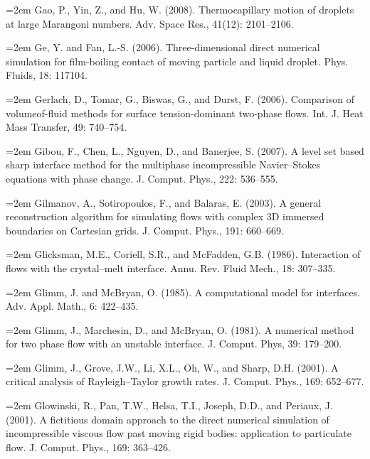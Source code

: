 \documentclass[11pt,a4paper,openany,fontset=none]{ctexbook}
\begin{document}
\par\hangindent=2em Gao, P., Yin, Z., and Hu, W. (2008). Thermocapillary motion of droplets at large Marangoni numbers. Adv. Space Res., 41(12): 2101--2106.

\par\hangindent=2em Ge, Y. and Fan, L.-S. (2006). Three-dimensional direct numerical simulation for film-boiling contact of moving particle and liquid droplet. Phys. Fluids, 18: 117104.

\par\hangindent=2em Gerlach, D., Tomar, G., Biswas, G., and Durst, F. (2006). Comparison of volumeof-fluid methods for surface tension-dominant two-phase flows. Int. J. Heat Mass Transfer, 49: 740--754.

\par\hangindent=2em Gibou, F., Chen, L., Nguyen, D., and Banerjee, S. (2007). A level set based sharp interface method for the multiphase incompressible Navier--Stokes equations with phase change. J. Comput. Phys., 222: 536--555.

\par\hangindent=2em Gilmanov, A., Sotiropoulos, F., and Balaras, E. (2003). A general reconstruction algorithm for simulating flows with complex 3D immersed boundaries on Cartesian grids. J. Comput. Phys., 191: 660--669.

\par\hangindent=2em Glicksman, M.E., Coriell, S.R., and McFadden, G.B. (1986). Interaction of flows with the crystal--melt interface. Annu. Rev. Fluid Mech., 18: 307--335.

\par\hangindent=2em Glimm, J. and McBryan, O. (1985). A computational model for interfaces. Adv. Appl. Math., 6: 422--435.

\par\hangindent=2em Glimm, J., Marchesin, D., and McBryan, O. (1981). A numerical method for two phase flow with an unstable interface. J. Comput. Phys, 39: 179--200.


\par\hangindent=2em Glimm, J., Grove, J.W., Li, X.L., Oh, W., and Sharp, D.H. (2001). A critical analysis of Rayleigh--Taylor growth rates. J. Comput. Phys., 169: 652--677.

\par\hangindent=2em Glowinski, R., Pan, T.W., Helsa, T.I., Joseph, D.D., and Periaux, J. (2001). A fictitious domain approach to the direct numerical simulation of incompressible viscous flow past moving rigid bodies: application to particulate flow. J. Comput. Phys., 169: 363--426.
\end{document}
